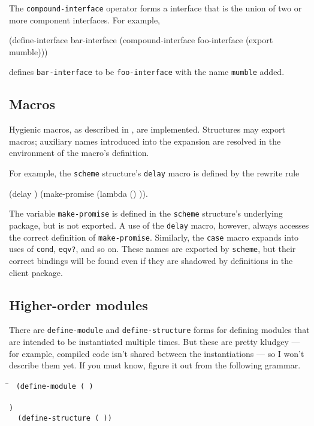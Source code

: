 The {\tt compound-interface} operator forms a interface that is the
union of two or more component interfaces.  For example,
\begin{code}
    (define-interface bar-interface
      (compound-interface foo-interface (export mumble)))
\end{code}
defines {\tt bar-interface} to be {\tt foo-interface} with the name
{\tt mumble} added.


\subsection*{Macros}

Hygienic macros, as described in
\cite{Clinger-Rees:Macros,Clinger-Rees:R4RS}, are implemented.
Structures may export macros; auxiliary names introduced into the
expansion are resolved in the environment of the macro's definition.

For example, the {\tt scheme} structure's {\tt delay} macro 
is defined by the rewrite rule
\begin{code}
    (delay )  \xform  (make-promise (lambda () ))\rm.
\end{code}
The variable {\tt make-promise} is defined in the {\tt scheme}
structure's underlying package, but is not exported.  A use of the
{\tt delay} macro, however, always accesses the correct definition
of {\tt make-promise}.  Similarly, the {\tt case} macro expands into
uses of {\tt cond}, {\tt eqv?}, and so on.  These names are exported
by {\tt scheme}, but their correct bindings will be found even if they
are shadowed by definitions in the client package.


\subsection*{Higher-order modules}

There are {\tt define-module} and {\tt define-structure} forms for
defining modules that are intended to be instantiated multiple times.
But these are pretty kludgey --- for example, compiled code isn't
shared between the instantiations --- so I won't describe them yet.
If you must know, figure it out from the following grammar.
\begin{tabbing}
\qquad
    \=\goesto{}~
      \tt(d\=\tt{}efine-module ( ) \\
       \>  \> \\
       \>  \>\tt) \\
	\>\altz{}~ \tt(define-structure 
		        ( ))
\end{tabbing}


